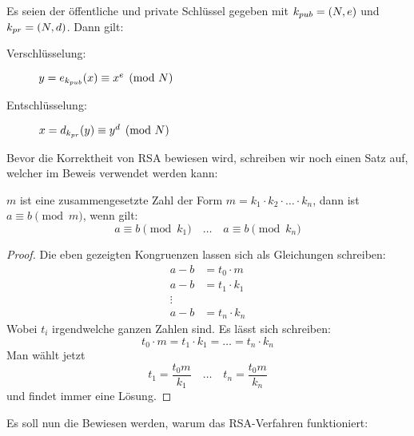 \begin{definition}
  Es seien der öffentliche und private Schlüssel gegeben mit
  $k_{pub} = (N,e)$ und $k_{pr} = (N,d)$. Dann gilt:
  \begin{description}
    \item[Verschlüsselung:] $y = e_{k_{pub}}(x) \equiv x^e \pmod{N}$
    \item[Entschlüsselung:] $x = d_{k_{pr}}(y) \equiv y^d \pmod{N}$
  \end{description}
\end{definition}

\noindent
Bevor die Korrektheit von RSA bewiesen wird, schreiben wir noch einen Satz auf, welcher im
Beweis verwendet werden kann:

\begin{satz}
  \label{satz:composite-mod}
  $m$ ist eine zusammengesetzte Zahl der Form $m = k_1 \cdot k_2 \cdot \ldots \cdot k_n$, dann
  ist $a \equiv b \pmod{m}$, wenn gilt:
  \begin{equation*}
    a \equiv b \pmod{k_1} \quad\ldots\quad a \equiv b \pmod{k_n}
  \end{equation*}
\end{satz}
\begin{proof}
  Die eben gezeigten Kongruenzen lassen sich als Gleichungen schreiben:
  \begin{align*}
    a - b & = t_0 \cdot m   \\
    a - b & = t_1 \cdot k_1 \\
    \vdots                  \\
    a - b & = t_n \cdot k_n
  \end{align*}
  Wobei $t_i$ irgendwelche ganzen Zahlen sind. Es lässt sich schreiben:
  \begin{equation*}
    t_0 \cdot m = t_1 \cdot k_1 = \ldots = t_n \cdot k_n
  \end{equation*}
  Man wählt jetzt
  \begin{equation*}
    t_1 = \frac{t_0m}{k_1} \quad\ldots\quad t_n = \frac{t_0m}{k_n}
  \end{equation*}
  und findet immer eine Lösung.
\end{proof}

\noindent
Es soll nun die Bewiesen werden, warum das RSA-Verfahren funktioniert:

